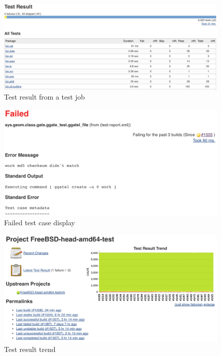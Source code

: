\documentclass[a4paper,twocolumn,10pt]{article}
\begin{document}
\begin{figure}
\includegraphics[width=\textwidth]{test-result.png}
\caption{Test result from a test job}
\label{test-result}
\end{figure}

\begin{figure}
\includegraphics[width=\textwidth]{failed-result.png}
\caption{Failed test case display}
\label{failed-result}
\end{figure}

\begin{figure}
\includegraphics[width=\textwidth]{test-result-trend.png}
\caption{Test result trend}
\label{test-result-trend}
\end{figure}
\end{document}
